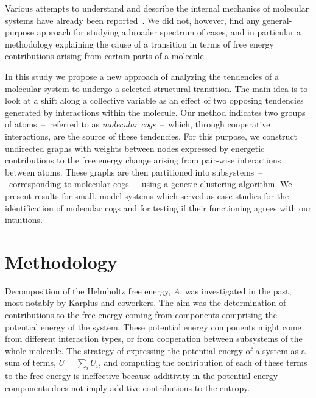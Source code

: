\documentclass[a4paper,11pt,twoside]{book}%
\begin{document}
Various attempts to understand and describe the internal mechanics of {\color{black}molecular systems} have already been reported~\cite{arnautova2011development,bao2009protein,chiang2013molecular,lavery2007protein,sacquin2014motions,van1997engineering,seifert2013protein}.
We did not, however, find any general-purpose approach for studying a broader spectrum of cases, and in particular a methodology explaining the cause of a transition in terms of free energy contributions arising from certain parts of a molecule.

In this study we propose a new approach of analyzing the tendencies of a {\color{black}molecular} system to undergo a selected structural transition.
The main idea is to look at a shift along a collective variable as an effect of two opposing tendencies generated by interactions within the molecule.
Our method {\color{black}indicates} two groups of atoms~--~referred to as \emph{molecular cogs}~--~which, through cooperative interactions, are the source of these tendencies.
For this purpose, we construct undirected graphs with weights between nodes expressed by energetic contributions to the free energy change arising from pair-wise interactions between atoms.
{\color{black}
These graphs are then partitioned into subsystems~--~corresponding to molecular cogs~--~using a genetic clustering algorithm.
We present results for small, model systems which served as case-studies for the identification of molecular cogs and for testing if their functioning agrees with our intuitions.
}


\section{Methodology}


Decomposition of the Helmholtz free energy, $A$, was investigated in the past, most notably by Karplus and coworkers\cite{boresch1995meaning,brady1995decomposition}.
{\color{black}The aim was the determination of contributions to the free energy coming from components comprising the potential energy of the system.
These potential energy components might come from different interaction types, or from cooperation between subsystems of the whole molecule.}
The strategy of expressing the potential energy of a system as a sum of terms, $U=\sum_i U_i$, and {\color{black}computing} the contribution of each of these terms to the free energy is ineffective because additivity in the potential energy components does not imply additive contributions to the entropy\cite{dill1997additivity}.
\end{document}

